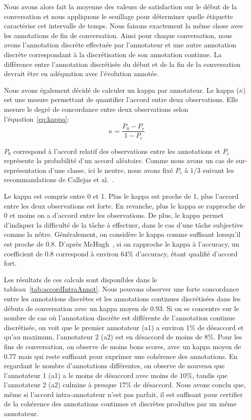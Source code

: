 Nous avons alors fait la moyenne des valeurs de satisfaction sur le début de la conversation et nous appliquons le seuillage pour déterminer quelle étiquette caractérise cet intervalle de temps. Nous faisons exactement la même chose avec les annotations de fin de conversation. Ainsi pour chaque conversation, nous avons l'annotation discrète effectuée par l'annotateur et une autre annotation discrète correspondant à la discrétisation de son annotation continue.
La différence entre l'annotation discrétisée du début et de la fin de la conversation devrait être en adéquation avec l'évolution annotée.

Nous avons également décidé de calculer un kappa par annotateur.
Le kappa ($\kappa$) est une mesure permettant de quantifier l'accord entre deux observations. Elle mesure le degré de concordance entre deux observations selon l'équation~\ref{eq:kappa}:
\begin{equation}
    \kappa = \dfrac{P_0 - P_e}{1 - P_e}
    \label{eq:kappa}
\end{equation}

$P_0$ correspond à l'accord relatif des observations entre les annotations et $P_e$ représente la probabilité d'un accord aléatoire. Comme nous avons un cas de sur-représentation d'une classe, ici le neutre, nous avons fixé $P_e$ à $1/3$ suivant les recommandations de Callejas et al.~\cite{Callejas2008}.

Le kappa est compris entre 0 et 1. Plus le kappa est proche de 1, plus l'accord entre les deux observations est forte. En revanche, plus le kappa se rapproche de 0 et moins on a d'accord entre les observations. De plus, le kappa permet d'indiquer la difficulté de la tâche à effectuer, dans le cas d'une tâche subjective comme la nôtre. Généralement, on considère le kappa comme suffisant lorsqu'il est proche de 0.8. D'après McHugh~\cite{McHugh2012}, si on rapproche le kappa à l'accuracy, un coefficient de 0.8 correspond à environ 64\% d'accuracy, étant qualifié d'accord fort.


Les résultats de ces calculs sont disponibles dans le tableau~\ref{tab:accordIntraAnnot}. Nous pouvons observer une forte concordance entre les annotations discrètes et les annotations continues discrétisées dans les débuts de conversation avec un kappa moyen de 0.93. Si on se concentre sur le nombre de cas où l'annotation discrète est différente de l'annotation continue discrétisée, on voit que le premier annotateur (a1) a environ 1\% de désaccord et qu'au maximum, l'annotateur 2 (a2) est en désaccord de moins de 8\%.
Pour les fins de conversation, on observe de moins bons scores, avec un kappa moyen de 0.77 mais qui reste suffisant pour exprimer une cohérence des annotations. En regardant le nombre d'annotations différentes, on observe de nouveau que l'annotateur 1 (a1) a le moins de désaccord avec moins de 10\%, tandis que l'annotateur 2 (a2) culmine à presque 17\% de désaccord.
Nous avons conclu que, même si l'accord intra-annotateur n'est pas parfait, il est suffisant pour certifier de la cohérence des annotations continues et discrètes produites par un même annotateur.

